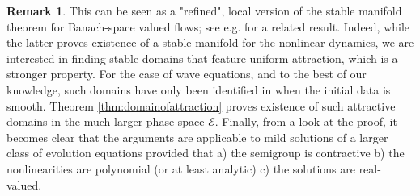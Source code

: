 \documentclass[10pt, reqno]{amsart}
\newcommand{\e}{\mathcal{E}}
\theoremstyle{definition}
\newtheorem{rem}{Remark}
\numberwithin{lem}{section}
\numberwithin{cor}{section}
\numberwithin{prop}{section}
\numberwithin{thm}{section}
\numberwithin{dfn}{section}
\begin{document}
\begin{rem} This can be seen as a "refined", local version of the stable manifold theorem for Banach-space valued flows; see e.g. \cite[Theorem 1.1]{gallay1993center} for a related result. Indeed, while the latter proves existence of a stable manifold for the nonlinear dynamics, we are interested in finding stable domains that feature uniform attraction, which is a stronger property. For the case of wave equations, and to the best of our knowledge, such domains have only been identified in \cite[Theorem 1]{sattinger1968global} when the initial data is smooth. Theorem \ref{thm:domainofattraction} proves existence of such attractive domains in the much larger phase space $\e.$ Finally, from a look at the proof, it becomes clear that
the arguments are applicable to mild solutions of a larger class of evolution equations provided that a) the semigroup is contractive b) the nonlinearities are polynomial (or at least analytic) c) the solutions are real-valued.
\end{rem}
\end{document}
